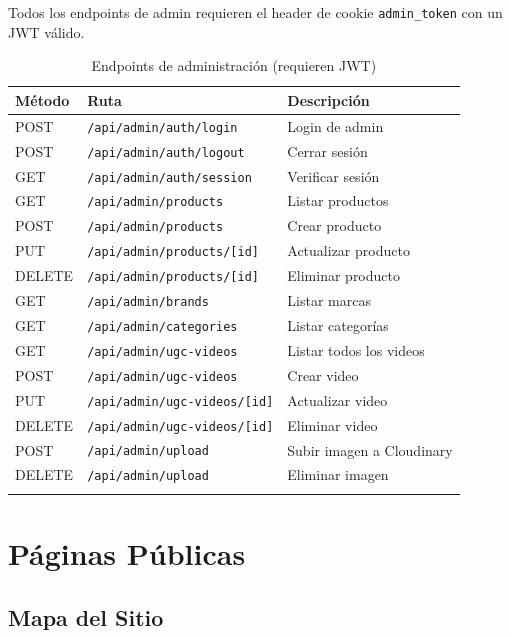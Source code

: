 \documentclass[12pt, a4paper]{article}
\begin{document}
Todos los endpoints de admin requieren el header de cookie \texttt{admin\_token} con un JWT v\'{a}lido.

\begin{longtable}{lll}
\toprule
\textbf{M\'{e}todo} & \textbf{Ruta} & \textbf{Descripci\'{o}n} \\
\midrule
\endhead
POST & \texttt{/api/admin/auth/login} & Login de admin \\
POST & \texttt{/api/admin/auth/logout} & Cerrar sesi\'{o}n \\
GET & \texttt{/api/admin/auth/session} & Verificar sesi\'{o}n \\
GET & \texttt{/api/admin/products} & Listar productos \\
POST & \texttt{/api/admin/products} & Crear producto \\
PUT & \texttt{/api/admin/products/[id]} & Actualizar producto \\
DELETE & \texttt{/api/admin/products/[id]} & Eliminar producto \\
GET & \texttt{/api/admin/brands} & Listar marcas \\
GET & \texttt{/api/admin/categories} & Listar categor\'{i}as \\
GET & \texttt{/api/admin/ugc-videos} & Listar todos los videos \\
POST & \texttt{/api/admin/ugc-videos} & Crear video \\
PUT & \texttt{/api/admin/ugc-videos/[id]} & Actualizar video \\
DELETE & \texttt{/api/admin/ugc-videos/[id]} & Eliminar video \\
POST & \texttt{/api/admin/upload} & Subir imagen a Cloudinary \\
DELETE & \texttt{/api/admin/upload} & Eliminar imagen \\
\bottomrule
\caption{Endpoints de administraci\'{o}n (requieren JWT)}
\end{longtable}

\section{P\'{a}ginas P\'{u}blicas}

\subsection{Mapa del Sitio}
\end{document}
